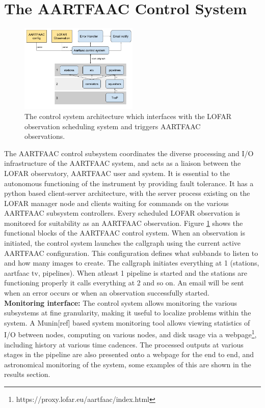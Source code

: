 \documentclass{ws-jai}
\begin{document}
\section {\label{sec:acontrol} The AARTFAAC Control System}
\begin{figure}[htbp]
\centering
\includegraphics[width=0.50\textwidth]{Figs/acs.png}
\caption{The  control  system  architecture  which  interfaces  with  the  LOFAR
  observation scheduling system and triggers AARTFAAC observations.}
\label{fig:afaac_ctrl_sys}
\end{figure}
The  AARTFAAC  control subsystem  coordinates  the  diverse processing  and
I/O infrastructure of  the AARTFAAC system, and  acts as a liaison  between the
LOFAR observatory,  AARTFAAC user  and  system.   It is  essential  to the
autonomous functioning of  the instrument by  providing fault  tolerance.  It
has  a python based client-server architecture, with the  server process
existing on the LOFAR manager node and clients waiting for  commands on the
various AARTFAAC subsystem controllers. Every scheduled  LOFAR observation is
monitored  for suitability as an AARTFAAC observation. Figure
\ref{fig:afaac_ctrl_sys} shows the functional blocks  of  the AARTFAAC  control
system.  When an observation is initiated, the control system launches the
callgraph using the current active AARTFAAC configuration. This configuration
defines what subbands to listen to and how many images to create.  The
callgraph initiates everything at 1 (stations, aartfaac tv, pipelines). When
atleast 1 pipeline is started and the stations are functioning properly it
calls everything at 2 and so on. An email will be sent when an error occurs or
when an observation successfully started.\\  

\noindent \textbf  {Monitoring interface:} The control  system allows monitoring
the  various  subsystems at  fine  granularity,  making  it useful  to  localize
problems within  the system.  A  Munin[ref] based system monitoring  tool allows
viewing statistics  of I/O between nodes,  computing on various nodes,  and disk
usage   via    a   webpage\footnote{https://proxy.lofar.eu/aartfaac/index.html},
including history  at various time  cadences.  The processed outputs  at various
stages in the pipeline are also presented onto a webpage for the end to end, and
astronomical monitoring  of the system, some  examples of this are  shown in the
results section.
\end{document}
